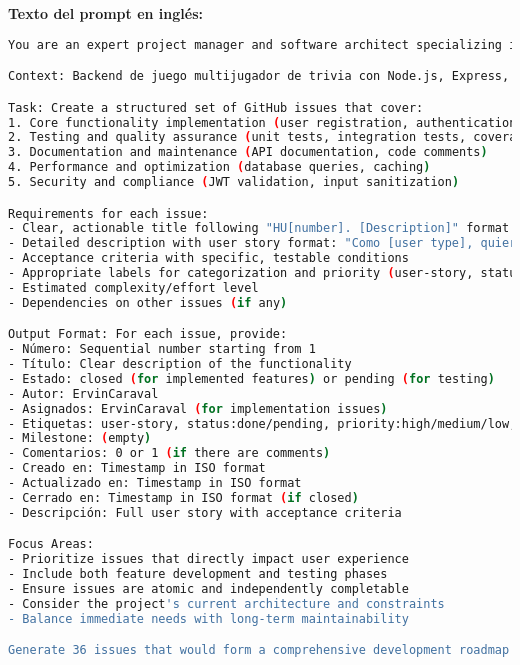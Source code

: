 \documentclass[12pt,a4paper]{article}
\begin{document}
\textbf{Texto del prompt en inglés:}
\begin{lstlisting}[language=bash]
You are an expert project manager and software architect specializing in user story creation and project organization. Given a software project context, generate comprehensive GitHub issues that follow best practices for development workflow.

Context: Backend de juego multijugador de trivia con Node.js, Express, Socket.io, Firebase. Sistema actualmente funcional con partidas en tiempo real, autenticación JWT, y generación de preguntas con IA.

Task: Create a structured set of GitHub issues that cover:
1. Core functionality implementation (user registration, authentication, game management)
2. Testing and quality assurance (unit tests, integration tests, coverage)
3. Documentation and maintenance (API documentation, code comments)
4. Performance and optimization (database queries, caching)
5. Security and compliance (JWT validation, input sanitization)

Requirements for each issue:
- Clear, actionable title following "HU[number]. [Description]" format
- Detailed description with user story format: "Como [user type], quiero [functionality] para [benefit]"
- Acceptance criteria with specific, testable conditions
- Appropriate labels for categorization and priority (user-story, status:done/pending, priority:high/medium/low, backend)
- Estimated complexity/effort level
- Dependencies on other issues (if any)

Output Format: For each issue, provide:
- Número: Sequential number starting from 1
- Título: Clear description of the functionality
- Estado: closed (for implemented features) or pending (for testing)
- Autor: ErvinCaraval
- Asignados: ErvinCaraval (for implementation issues)
- Etiquetas: user-story, status:done/pending, priority:high/medium/low, backend
- Milestone: (empty)
- Comentarios: 0 or 1 (if there are comments)
- Creado en: Timestamp in ISO format
- Actualizado en: Timestamp in ISO format  
- Cerrado en: Timestamp in ISO format (if closed)
- Descripción: Full user story with acceptance criteria

Focus Areas:
- Prioritize issues that directly impact user experience
- Include both feature development and testing phases
- Ensure issues are atomic and independently completable
- Consider the project's current architecture and constraints
- Balance immediate needs with long-term maintainability

Generate 36 issues that would form a comprehensive development roadmap covering all aspects of the trivia game backend system.
\end{lstlisting}
\end{document}
